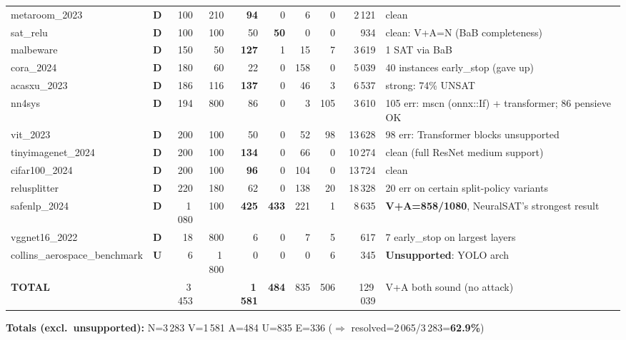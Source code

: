 \documentclass[10pt]{beamer}
\newcommand{\sdone}{{\color{cdone}\textbf{D}}}
\newcommand{\sunsup}{{\color{cunsup}\textbf{U}}}
\begin{document}
\begin{frame}[fragile]
\begin{tabular}{l c r r r r r r r l}
metaroom\_2023                  & \sdone  & 100  & 210  & \textbf{94} & 0 & 6 & 0 & 2\,121 & clean \\
sat\_relu                       & \sdone  & 100  & 100  & 50   & \textbf{50} & 0 & 0 & 934 & clean: V+A=N (BaB completeness) \\
malbeware                       & \sdone  & 150  & 50   & \textbf{127} & 1 & 15 & 7 & 3\,619 & 1 SAT via BaB \\
cora\_2024                      & \sdone  & 180  & 60   & 22   & 0   & 158 & 0  & 5\,039  & 40 instances early\_stop (gave up) \\
acasxu\_2023                    & \sdone  & 186  & 116  & \textbf{137} & 0 & 46 & 3 & 6\,537 & strong: 74\% UNSAT \\
nn4sys                          & \sdone  & 194  & 800  & 86   & 0   & 3   & 105 & 3\,610 & 105 err: mscn (onnx::If) + transformer; 86 pensieve OK \\
vit\_2023                       & \sdone  & 200  & 100  & 50   & 0   & 52  & 98  & 13\,628 & 98 err: Transformer blocks unsupported \\
tinyimagenet\_2024              & \sdone  & 200  & 100  & \textbf{134} & 0 & 66 & 0 & 10\,274 & clean (full ResNet medium support) \\
cifar100\_2024                  & \sdone  & 200  & 100  & \textbf{96} & 0 & 104 & 0 & 13\,724 & clean \\
relusplitter                    & \sdone  & 220  & 180  & 62   & 0   & 138 & 20  & 18\,328 & 20 err on certain split-policy variants \\
safenlp\_2024                   & \sdone  & 1\,080 & 100 & \textbf{425} & \textbf{433} & 221 & 1 & 8\,635 & \textbf{V+A=858/1080}, NeuralSAT's strongest result \\
vggnet16\_2022                  & \sdone  & 18   & 800  & 6    & 0   & 7   & 5   & 617     & 7 early\_stop on largest layers \\
collins\_aerospace\_benchmark   & \sunsup & 6    & 1\,800 & 0  & 0   & 0   & 6   & 345     & \textbf{Unsupported}: YOLO arch \\
\midrule
\textbf{TOTAL}                  &         & 3\,453 &      & \textbf{1\,581} & \textbf{484} & 835 & 506 & 129\,039 & V+A both sound (no attack) \\
\bottomrule
\end{tabular}

\vspace{0.4em}
\centering\scriptsize
\textbf{Totals (excl.\ unsupported):} \quad N=3\,283 \quad V=1\,581 \quad A=484 \quad U=835 \quad E=336 \quad ($\Rightarrow$ resolved=2\,065/3\,283=\textbf{62.9\%})


\end{frame}
\end{document}
